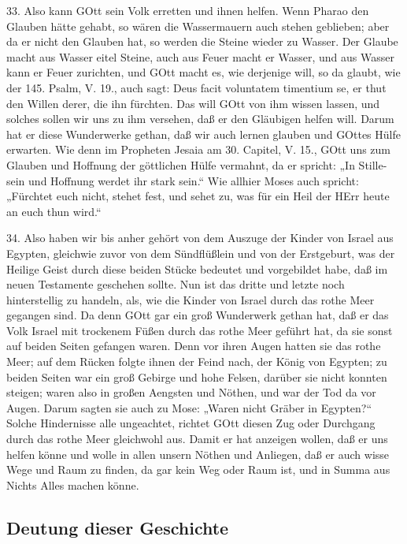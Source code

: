 33. Also kann GOtt sein Volk erretten und ihnen helfen. Wenn Pharao den Glauben hätte gehabt, so wären die Wassermauern auch stehen geblieben; aber da er nicht den Glauben hat, so werden die Steine wieder zu Wasser. Der Glaube macht aus Wasser eitel Steine, auch aus Feuer macht er Wasser, und aus Wasser kann er Feuer zurichten, und GOtt macht es, wie derjenige will, so da glaubt, wie der 145. Psalm, V. 19., auch sagt: Deus facit voluntatem timentium se, er thut den Willen derer, die ihn fürchten. Das will GOtt von ihm wissen lassen, und solches sollen wir uns zu ihm versehen, daß er den Gläubigen helfen will. Darum hat er diese Wunderwerke gethan, daß wir auch lernen glauben und GOttes Hülfe erwarten. Wie denn im Propheten Jesaia am 30. Capitel, V. 15., GOtt uns zum Glauben und Hoffnung der göttlichen Hülfe vermahnt, da er spricht: „In Stille-sein und Hoffnung werdet ihr stark sein.“ Wie allhier Moses auch spricht: „Fürchtet euch nicht, stehet fest, und sehet zu, was für ein Heil der HErr heute an euch thun wird.“

34. Also haben wir bis anher gehört von dem Auszuge der Kinder von Israel aus Egypten, gleichwie zuvor von dem Sündflüßlein und von der Erstgeburt, was der Heilige Geist durch diese beiden Stücke bedeutet und vorgebildet habe, daß im neuen Testamente geschehen sollte. Nun ist das dritte und letzte noch hinterstellig zu handeln, als, wie die Kinder von Israel durch
das rothe Meer gegangen sind. Da denn GOtt gar ein groß Wunderwerk gethan hat, daß er das Volk Israel mit trockenem Füßen durch das rothe Meer geführt hat, da sie sonst auf beiden Seiten gefangen waren. Denn vor ihren Augen hatten sie das rothe Meer; auf dem Rücken folgte ihnen der Feind nach, der König von Egypten; zu beiden Seiten war ein groß Gebirge und hohe Felsen, darüber sie nicht konnten steigen; waren also in großen Aengsten und Nöthen, und war der Tod da vor Augen. Darum sagten sie auch zu Mose: „Waren nicht Gräber in Egypten?“ Solche Hindernisse alle ungeachtet, richtet GOtt diesen Zug oder Durchgang durch das rothe Meer gleichwohl aus. Damit er hat anzeigen wollen, daß er uns helfen könne und wolle in allen unsern Nöthen und Anliegen, daß er auch wisse Wege und Raum zu finden, da gar kein Weg oder Raum ist, und in Summa aus Nichts Alles machen könne.

\subsection{Deutung dieser Geschichte}

